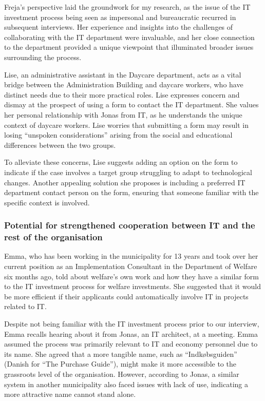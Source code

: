 \documentclass[
]{book}
\begin{document}
Freja's perspective laid the groundwork for my research, as the issue of the IT investment process being seen as impersonal and bureaucratic recurred in subsequent interviews. Her experience and insights into the challenges of collaborating with the IT department were invaluable, and her close connection to the department provided a unique viewpoint that illuminated broader issues surrounding the process.

Lise, an administrative assistant in the Daycare department, acts as a vital bridge between the Administration Building and daycare workers, who have distinct needs due to their more practical roles. Lise expresses concern and dismay at the prospect of using a form to contact the IT department. She values her personal relationship with Jonas from IT, as he understands the unique context of daycare workers. Lise worries that submitting a form may result in losing ``unspoken considerations'' arising from the social and educational differences between the two groups.

To alleviate these concerns, Lise suggests adding an option on the form to indicate if the case involves a target group struggling to adapt to technological changes. Another appealing solution she proposes is including a preferred IT department contact person on the form, ensuring that someone familiar with the specific context is involved.

\hypertarget{potential-for-strengthened-cooperation-between-it-and-the-rest-of-the-organisation}{%
\subsubsection{Potential for strengthened cooperation between IT and the rest of the organisation}\label{potential-for-strengthened-cooperation-between-it-and-the-rest-of-the-organisation}}

Emma, who has been working in the municipality for 13 years and took over her current position as an Implementation Consultant in the Department of Welfare six months ago, told about welfare's own work and how they have a similar form to the IT investment process for welfare investments. She suggested that it would be more efficient if their applicants could automatically involve IT in projects related to IT.

Despite not being familiar with the IT investment process prior to our interview, Emma recalls hearing about it from Jonas, an IT architect, at a meeting. Emma assumed the process was primarily relevant to IT and economy personnel due to its name. She agreed that a more tangible name, such as ``Indkøbsguiden'' (Danish for ``The Purchase Guide''), might make it more accessible to the grassroots level of the organisation. However, according to Jonas, a similar system in another municipality also faced issues with lack of use, indicating a more attractive name cannot stand alone.
\end{document}
